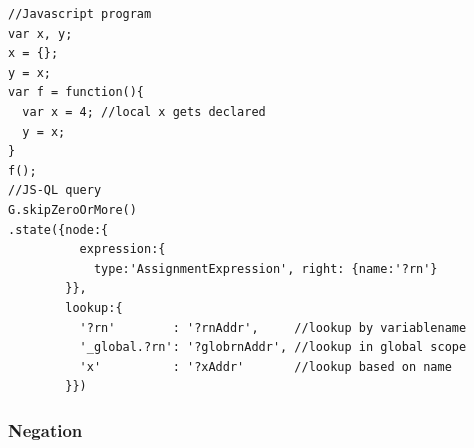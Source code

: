 \begin{lstlisting}[label={lst:lookup},language=JSQL, caption=Looking up addresses in JS-QL,mathescape=true]
//Javascript program
var x, y;
x = {};
y = x;
var f = function(){
  var x = 4; //local x gets declared
  y = x;
}
f();
//JS-QL query
G.skipZeroOrMore()
.state({node:{
          expression:{
            type:'AssignmentExpression', right: {name:'?rn'}
        }},
        lookup:{
          '?rn'        : '?rnAddr',     //lookup by variablename
          '_global.?rn': '?globrnAddr', //lookup in global scope
          'x'          : '?xAddr'       //lookup based on name
        }})
\end{lstlisting}



\subsubsection{Negation}


